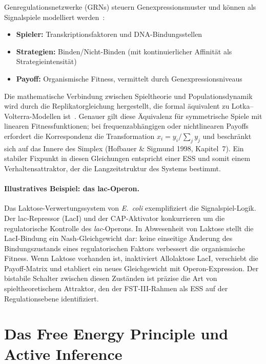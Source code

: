 \documentclass[12pt,a4paper]{article}
\theoremstyle{remark}
\begin{document}
Genregulationsnetzwerke (GRNs) steuern Genexpressionsmuster und können als Signalspiele modelliert werden~\citep{GameBiochemistry}:

\begin{itemize}
    \item \textbf{Spieler:} Transkriptionsfaktoren und DNA-Bindungsstellen
    \item \textbf{Strategien:} Binden/Nicht-Binden (mit kontinuierlicher Affinität als Strategieintensität)
    \item \textbf{Payoff:} Organismische Fitness, vermittelt durch Genexpressionsniveaus
\end{itemize}

Die mathematische Verbindung zwischen Spieltheorie und Populationsdynamik wird durch die Replikatorgleichung hergestellt, die formal äquivalent zu Lotka--Volterra-Modellen ist~\citep{HofbauerSigmund1998}. Genauer gilt diese Äquivalenz für symmetrische Spiele mit linearen Fitnessfunktionen; bei frequenzabhängigen oder nichtlinearen Payoffs erfordert die Korrespondenz die Transformation $x_i = y_i / \sum_j y_j$ und beschränkt sich auf das Innere des Simplex (Hofbauer \& Sigmund 1998, Kapitel~7). Ein stabiler Fixpunkt in diesen Gleichungen entspricht einer ESS und somit einem Verhaltensattraktor, der die Langzeitstruktur des Systems bestimmt.

\paragraph{Illustratives Beispiel: das lac-Operon.}
Das Laktose-Verwertungssystem von \textit{E.\ coli} exemplifiziert die Signalspiel-Logik. Der lac-Repressor (LacI) und der CAP-Aktivator konkurrieren um die regulatorische Kontrolle des \textit{lac}-Operons. In Abwesenheit von Laktose stellt die LacI-Bindung ein Nash-Gleichgewicht dar: keine einseitige Änderung des Bindungszustands eines regulatorischen Faktors verbessert die organismische Fitness. Wenn Laktose vorhanden ist, inaktiviert Allolaktose LacI, verschiebt die Payoff-Matrix und etabliert ein neues Gleichgewicht mit Operon-Expression. Der bistabile Schalter zwischen diesen Zuständen ist präzise die Art von spieltheoretischem Attraktor, den der FST-III-Rahmen als ESS auf der Regulationsebene identifiziert.

\section{Das Free Energy Principle und Active Inference}
\label{sec:fep}
\end{document}
